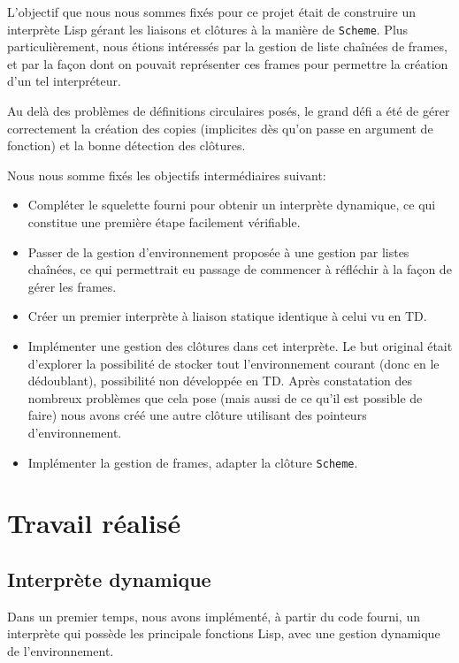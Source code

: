 \documentclass[a4paper,11pt]{article}
\begin{document}
L'objectif que nous nous sommes fixés pour ce projet était de construire un
interprète Lisp gérant les liaisons et clôtures à la manière de \texttt{Scheme}. Plus
particulièrement, nous étions intéressés par la gestion de liste chaînées de
frames, et par la façon dont on pouvait représenter ces frames pour permettre la
création d'un tel interpréteur.

Au delà des problèmes de définitions circulaires posés, le grand défi a été de
gérer correctement la création des copies (implicites dès qu'on passe en
argument de fonction) et la bonne détection des clôtures.

Nous nous somme fixés les objectifs intermédiaires suivant:
\begin{itemize}
\item Compléter le squelette fourni pour obtenir un interprète dynamique, ce qui
  constitue une première étape facilement vérifiable.
\item Passer de la gestion d'environnement proposée à une gestion par listes
  chaînées, ce qui permettrait eu passage de commencer à réfléchir à la façon de
  gérer les frames.
\item Créer un premier interprète à liaison statique identique à celui vu en TD.
\item Implémenter une gestion des clôtures dans cet interprète. Le but original
  était d'explorer la possibilité de stocker tout l'environnement courant (donc
  en le dédoublant), possibilité non développée en TD. Après constatation des
  nombreux problèmes que cela pose (mais aussi de ce qu'il est possible de
  faire) nous avons créé une autre clôture utilisant des pointeurs
  d'environnement.
\item Implémenter la gestion de frames, adapter la clôture \texttt{Scheme}.
\end{itemize}


\section{Travail réalisé}

\subsection{Interprète dynamique}

Dans un premier temps, nous avons implémenté, à partir du code fourni, un interprète 
qui possède les principale fonctions Lisp, avec une gestion dynamique de l'environnement.
\end{document}
